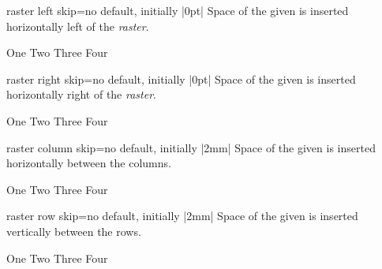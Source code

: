 \clearpage

\begin{docTcbKey}[][doc new=2014-11-10]{raster left skip}{=}{no default, initially |0pt|}
  Space of the given  is inserted horizontally left of the \emph{raster}.
\begin{dispExample}
\begin{tcbitemize}[raster left skip=2cm,
  size=small,colframe=red!50!black,colback=red!10!white]
  \tcbitem One
  \tcbitem Two
  \tcbitem Three
  \tcbitem Four
\end{tcbitemize}
\end{dispExample}
\end{docTcbKey}


\begin{docTcbKey}[][doc new=2014-11-10]{raster right skip}{=}{no default, initially |0pt|}
  Space of the given  is inserted horizontally right of the \emph{raster}.
\begin{dispExample}
\begin{tcbitemize}[raster right skip=2cm,
  size=small,colframe=red!50!black,colback=red!10!white]
  \tcbitem One
  \tcbitem Two
  \tcbitem Three
  \tcbitem Four
\end{tcbitemize}
\end{dispExample}
\end{docTcbKey}

\enlargethispage*{1cm}

\begin{docTcbKey}[][doc new=2014-11-10]{raster column skip}{=}{no default, initially |2mm|}
 Space of the given  is inserted horizontally between the columns.
\begin{dispExample}
\begin{tcbitemize}[raster column skip=2cm,
  size=small,colframe=red!50!black,colback=red!10!white]
  \tcbitem One
  \tcbitem Two
  \tcbitem Three
  \tcbitem Four
\end{tcbitemize}
\end{dispExample}
\end{docTcbKey}

\begin{docTcbKey}[][doc new=2014-11-10]{raster row skip}{=}{no default, initially |2mm|}
 Space of the given  is inserted vertically between the rows.
\begin{dispExample}
\begin{tcbitemize}[raster row skip=0pt,
  size=small,colframe=red!50!black,colback=red!10!white]
  \tcbitem One
  \tcbitem Two
  \tcbitem Three
  \tcbitem Four
\end{tcbitemize}
\end{dispExample}
\end{docTcbKey}

